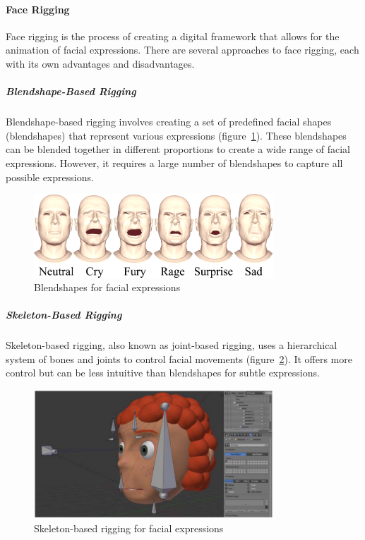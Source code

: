 \documentclass[../../main.tex]{subfiles}
\begin{document}
\paragraph{Face Rigging}
\label{ch:facial_expressions:related_work:face_rigging}

Face rigging is the process of creating a digital framework that allows for the animation of facial expressions. There are several approaches to face rigging, each with its own advantages and disadvantages.

\subparagraph{Blendshape-Based Rigging}
\label{ch:facial_expressions:related_work:face_rigging:blendshape_based_rigging}

Blendshape-based rigging involves creating a set of predefined facial shapes (blendshapes) that represent various expressions (figure~\ref{ch:facial_expressions:fig:blendshapes}). These blendshapes can be blended together in different proportions to create a wide range of facial expressions. However, it requires a large number of blendshapes to capture all possible expressions.

\begin{figure}
    \centering
    \includegraphics[width=0.8\textwidth]{chapters/facial_expressions/images/blendshapes.png}
    \caption{Blendshapes for facial expressions}
    \label{ch:facial_expressions:fig:blendshapes}
\end{figure}

\subparagraph{Skeleton-Based Rigging}
\label{ch:facial_expressions:related_work:face_rigging:skeleton_based_rigging}

Skeleton-based rigging, also known as joint-based rigging, uses a hierarchical system of bones and joints to control facial movements (figure~\ref{ch:facial_expressions:fig:skeleton_based_rigging}). It offers more control but can be less intuitive than blendshapes for subtle expressions.

\begin{figure}
    \centering
    \includegraphics[width=0.8\textwidth]{chapters/facial_expressions/images/skeleton_based_rigging.png}
    \caption{Skeleton-based rigging for facial expressions}
    \label{ch:facial_expressions:fig:skeleton_based_rigging}
\end{figure}
\end{document}
